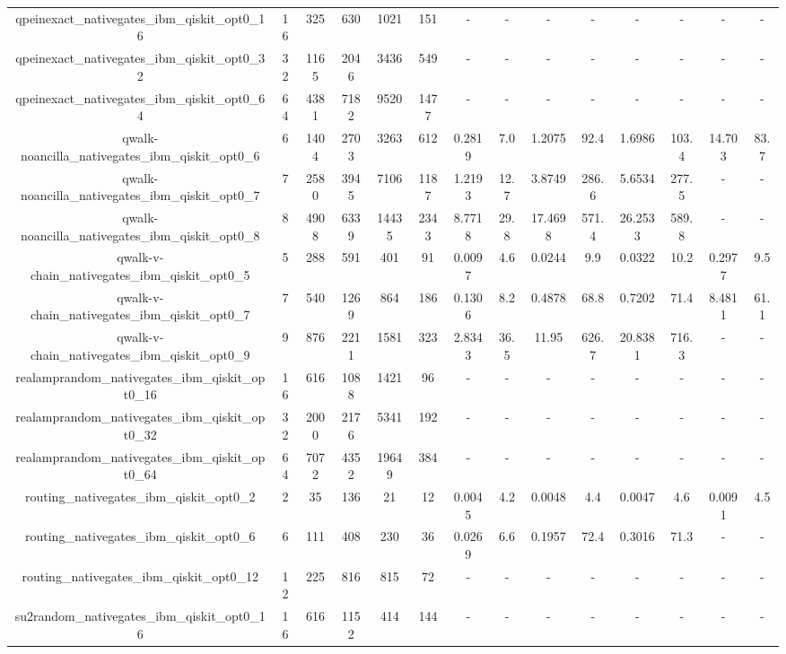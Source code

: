 \begin{table}[htb]
{\begin{tabular}{|c|c|c|c|c|c|c|c|c|c|c|c|c|c|}
qpeinexact\_nativegates\_ibm\_qiskit\_opt0\_16 & 16 & 325 & 630 & 1021 & 151 & - & - & - & - & - & - & - & - \\ 
qpeinexact\_nativegates\_ibm\_qiskit\_opt0\_32 & 32 & 1165 & 2046 & 3436 & 549 & - & - & - & - & - & - & - & - \\ 
qpeinexact\_nativegates\_ibm\_qiskit\_opt0\_64 & 64 & 4381 & 7182 & 9520 & 1477 & - & - & - & - & - & - & - & - \\ 
qwalk-noancilla\_nativegates\_ibm\_qiskit\_opt0\_6 & 6 & 1404 & 2703 & 3263 & 612 & 0.2819 & 7.0 & 1.2075 & 92.4 & 1.6986 & 103.4 & 14.703 & 83.7 \\ 
qwalk-noancilla\_nativegates\_ibm\_qiskit\_opt0\_7 & 7 & 2580 & 3945 & 7106 & 1187 & 1.2193 & 12.7 & 3.8749 & 286.6 & 5.6534 & 277.5 & - & - \\ 
qwalk-noancilla\_nativegates\_ibm\_qiskit\_opt0\_8 & 8 & 4908 & 6339 & 14435 & 2343 & 8.7718 & 29.8 & 17.4698 & 571.4 & 26.2533 & 589.8 & - & - \\ 
qwalk-v-chain\_nativegates\_ibm\_qiskit\_opt0\_5 & 5 & 288 & 591 & 401 & 91 & 0.0097 & 4.6 & 0.0244 & 9.9 & 0.0322 & 10.2 & 0.2977 & 9.5 \\ 
qwalk-v-chain\_nativegates\_ibm\_qiskit\_opt0\_7 & 7 & 540 & 1269 & 864 & 186 & 0.1306 & 8.2 & 0.4878 & 68.8 & 0.7202 & 71.4 & 8.4811 & 61.1 \\ 
qwalk-v-chain\_nativegates\_ibm\_qiskit\_opt0\_9 & 9 & 876 & 2211 & 1581 & 323 & 2.8343 & 36.5 & 11.95 & 626.7 & 20.8381 & 716.3 & - & - \\ 
realamprandom\_nativegates\_ibm\_qiskit\_opt0\_16 & 16 & 616 & 1088 & 1421 & 96 & - & - & - & - & - & - & - & - \\ 
realamprandom\_nativegates\_ibm\_qiskit\_opt0\_32 & 32 & 2000 & 2176 & 5341 & 192 & - & - & - & - & - & - & - & - \\ 
realamprandom\_nativegates\_ibm\_qiskit\_opt0\_64 & 64 & 7072 & 4352 & 19649 & 384 & - & - & - & - & - & - & - & - \\ 
routing\_nativegates\_ibm\_qiskit\_opt0\_2 & 2 & 35 & 136 & 21 & 12 & 0.0045 & 4.2 & 0.0048 & 4.4 & 0.0047 & 4.6 & 0.0091 & 4.5 \\ 
routing\_nativegates\_ibm\_qiskit\_opt0\_6 & 6 & 111 & 408 & 230 & 36 & 0.0269 & 6.6 & 0.1957 & 72.4 & 0.3016 & 71.3 & - & - \\ 
routing\_nativegates\_ibm\_qiskit\_opt0\_12 & 12 & 225 & 816 & 815 & 72 & - & - & - & - & - & - & - & - \\ 
su2random\_nativegates\_ibm\_qiskit\_opt0\_16 & 16 & 616 & 1152 & 414 & 144 & - & - & - & - & - & - & - & - \\ 

\end{tabular}}
\end{table}
